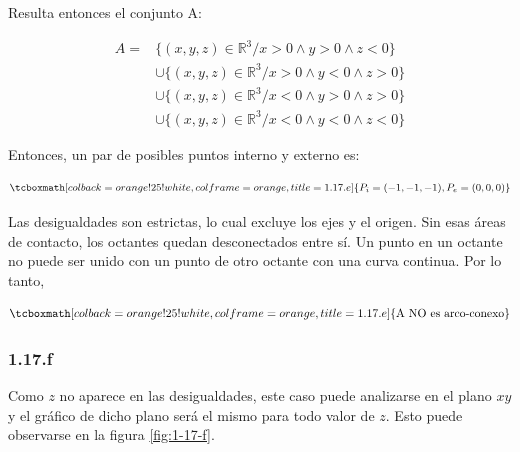 \documentclass{article}
\renewcommand{\Bbb}{\mathbb}
\begin{document}
Resulta entonces el conjunto A:

\begin{equation}
\begin{array}{ll}
A = & \{ (x,y,z) \in \Bbb R^3 / x > 0 \wedge y > 0 \wedge z < 0 \} \\
& \cup \{ (x,y,z) \in \Bbb R^3 / x > 0 \wedge y < 0 \wedge z > 0 \} \\
& \cup \{ (x,y,z) \in \Bbb R^3 / x < 0 \wedge y > 0 \wedge z > 0 \} \\
& \cup \{ (x,y,z) \in \Bbb R^3 / x < 0 \wedge y < 0 \wedge z < 0 \}
\end{array}
\end{equation}

Entonces, un par de posibles puntos interno y externo es:

\begin{equation}
\tcboxmath[colback=orange!25!white,colframe=orange,title=1.17.e]
{
P_i = (-1, -1, -1), P_e = (0, 0, 0)
}
\end{equation}

Las desigualdades son estrictas, lo cual excluye los ejes y el origen. Sin esas áreas de contacto, los octantes quedan desconectados entre sí. Un punto en un octante no puede ser unido con un punto de otro octante con una curva continua. Por lo tanto,

\begin{equation}
\tcboxmath[colback=orange!25!white,colframe=orange,title=1.17.e]
{ \text{A NO es arco-conexo} }
\end{equation}

\subsubsection*{1.17.f}
\label{subsubsec:1.17.f}

Como $z$ no aparece en las desigualdades, este caso puede analizarse en el plano $xy$ y el gráfico de dicho plano será el mismo para todo valor de $z$. Esto puede observarse en la figura \ref{fig:1-17-f}.
\end{document}
